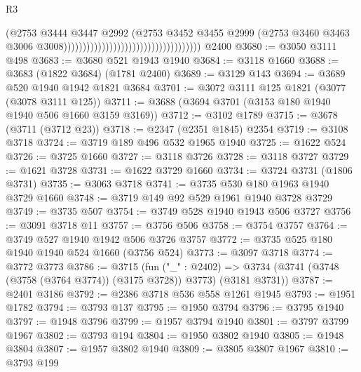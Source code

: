 \begin{lexlean}{R3}
\begin{coremodule}
                                                                      (@2753
                                                                        @3444
                                                                        @3447
                                                                        @2992
                                                                        (@2753
                                                                          @3452
                                                                          @3455
                                                                          @2999
                                                                          (@2753
                                                                            @3460
                                                                            @3463
                                                                            @3006
                                                                            @3008))))))))))))))))))))))))))))))))))))
    @2400
@3680 := @3050 @3111 @498
@3683 := @3680 @521 @1943 @1940
@3684 := @3118 @1660
@3688 := @3683 (@1822 @3684) (@1781 @2400)
@3689 := @3129 @143
@3694 := @3689 @520 @1940 @1942 @1821 @3684
@3701 := @3072 @3111 @125 @1821 (@3077 (@3078 @3111 @125))
@3711 := @3688 (@3694 @3701 (@3153 @180 @1940 @1940 @506 @1660 @3159 @3169))
@3712 := @3102 @1789
@3715 := @3678 (@3711 (@3712 @23))
@3718 := @2347 (@2351 @1845) @2354
@3719 := @3108 @3718
@3724 := @3719 @189 @496 @532 @1965 @1940
@3725 := @1622 @524
@3726 := @3725 @1660
@3727 := @3118 @3726
@3728 := @3118 @3727
@3729 := @1621 @3728
@3731 := @1622 @3729 @1660
@3734 := @3724 @3731 (@1806 @3731)
@3735 := @3063 @3718
@3741 := @3735 @530 @180 @1963 @1940 @3729 @1660
@3748 := @3719 @149 @92 @529 @1961 @1940 @3728 @3729
@3749 := @3735 @507
@3754 := @3749 @528 @1940 @1943 @506 @3727
@3756 := @3091 @3718 @11
@3757 := @3756 @506
@3758 := @3754 @3757
@3764 := @3749 @527 @1940 @1942 @506 @3726 @3757
@3772 := @3735 @525 @180 @1940 @1940 @524 @1660 (@3756 @524)
@3773 := @3097 @3718
@3774 := @3772 @3773
@3786 := @3715
    (fun ("_" : @2402) =>
    @3734 (@3741 (@3748 (@3758 (@3764 @3774)) (@3175 @3728)) @3773) (@3181 @3731))
@3787 := @2401 @3186
@3792 := @2386 @3718 @536 @558 @1261 @1945
@3793 := @1951 @1782
@3794 := @3793 @137
@3795 := @1950 @3794
@3796 := @3795 @1940
@3797 := @1948 @3796
@3799 := @1957 @3794 @1940
@3801 := @3797 @3799 @1967
@3802 := @3793 @194
@3804 := @1950 @3802 @1940
@3805 := @1948 @3804
@3807 := @1957 @3802 @1940
@3809 := @3805 @3807 @1967
@3810 := @3793 @199

\end{coremodule}
\end{lexlean}
